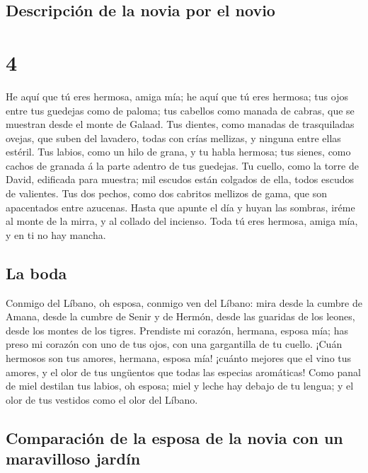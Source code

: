 \hypertarget{descripciuxf3n-de-la-novia-por-el-novio}{%
\subsection{Descripción de la novia por el
novio}\label{descripciuxf3n-de-la-novia-por-el-novio}}

\hypertarget{section-3}{%
\section{4}\label{section-3}}

 He aquí que tú eres hermosa, amiga mía; he aquí que tú eres
hermosa; tus ojos entre tus guedejas como de paloma; tus cabellos como
manada de cabras, que se muestran desde el monte de Galaad. 
Tus dientes, como manadas de trasquiladas ovejas, que suben del
lavadero, todas con crías mellizas, y ninguna entre ellas estéril.
 Tus labios, como un hilo de grana, y tu habla hermosa; tus
sienes, como cachos de granada á la parte adentro de tus guedejas.
 Tu cuello, como la torre de David, edificada para muestra;
mil escudos están colgados de ella, todos escudos de valientes.
 Tus dos pechos, como dos cabritos mellizos de gama, que son
apacentados entre azucenas.  Hasta que apunte el día y huyan
las sombras, iréme al monte de la mirra, y al collado del incienso.
 Toda tú eres hermosa, amiga mía, y en ti no hay mancha.

\hypertarget{la-boda}{%
\subsection{La boda}\label{la-boda}}

 Conmigo del Líbano, oh esposa, conmigo ven del Líbano: mira
desde la cumbre de Amana, desde la cumbre de Senir y de Hermón, desde
las guaridas de los leones, desde los montes de los tigres. 
Prendiste mi corazón, hermana, esposa mía; has preso mi corazón con uno
de tus ojos, con una gargantilla de tu cuello.  ¡Cuán
hermosos son tus amores, hermana, esposa mía! ¡cuánto mejores que el
vino tus amores, y el olor de tus ungüentos que todas las especias
aromáticas!  Como panal de miel destilan tus labios, oh
esposa; miel y leche hay debajo de tu lengua; y el olor de tus vestidos
como el olor del Líbano.

\hypertarget{comparaciuxf3n-de-la-esposa-de-la-novia-con-un-maravilloso-jarduxedn}{%
\subsection{Comparación de la esposa de la novia con un maravilloso
jardín}\label{comparaciuxf3n-de-la-esposa-de-la-novia-con-un-maravilloso-jarduxedn}}

